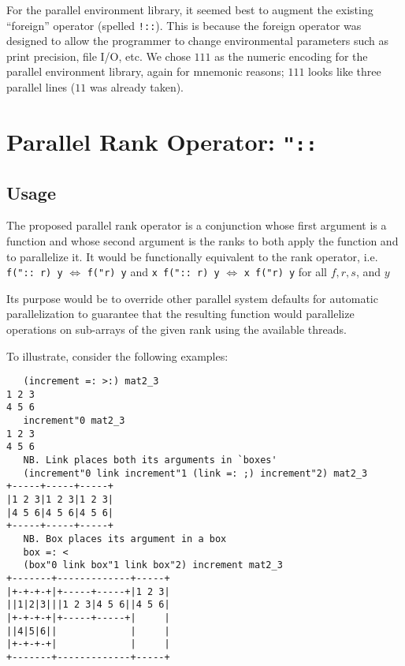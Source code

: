 For the parallel environment library, 
it seemed best to augment the existing ``foreign'' operator (spelled \texttt{!::}).
This is because the foreign operator was designed to 
allow the programmer to change environmental parameters 
such as print precision, file I/O, etc\cite{jvocab}. 
We chose $111$ as the numeric encoding for the parallel environment library, again for mnemonic reasons; 
$111$ looks like three parallel lines ($11$ was already taken).

\section{Parallel Rank Operator: \texttt{"::}}
\label{prank}

\subsection{Usage}
The proposed parallel rank operator is a conjunction 
whose first argument is a function 
and whose second argument is the ranks to both apply the function and to parallelize it. 
It would be functionally equivalent to the rank operator, i.e. 
\texttt{f(":: r) y} $\Leftrightarrow$ \texttt{f("r) y} and
\texttt{x f(":: r) y} $\Leftrightarrow$ \texttt{x f("r) y}
for all $f, r, s$, and $y$

Its purpose would be to override other parallel system defaults for automatic parallelization
to guarantee that the resulting function would parallelize operations on sub-arrays of the given rank 
using the available threads.

To illustrate, consider the following examples:

\begin{singlespacing}
\begin{small}
\begin{verbatim}
   (increment =: >:) mat2_3
1 2 3
4 5 6
   increment"0 mat2_3
1 2 3
4 5 6
   NB. Link places both its arguments in `boxes'
   (increment"0 link increment"1 (link =: ;) increment"2) mat2_3
+-----+-----+-----+
|1 2 3|1 2 3|1 2 3|
|4 5 6|4 5 6|4 5 6|
+-----+-----+-----+
   NB. Box places its argument in a box
   box =: <
   (box"0 link box"1 link box"2) increment mat2_3
+-------+-------------+-----+
|+-+-+-+|+-----+-----+|1 2 3|
||1|2|3|||1 2 3|4 5 6||4 5 6|
|+-+-+-+|+-----+-----+|     |
||4|5|6||             |     |
|+-+-+-+|             |     |
+-------+-------------+-----+

\end{verbatim}
\end{small}
\end{singlespacing}


